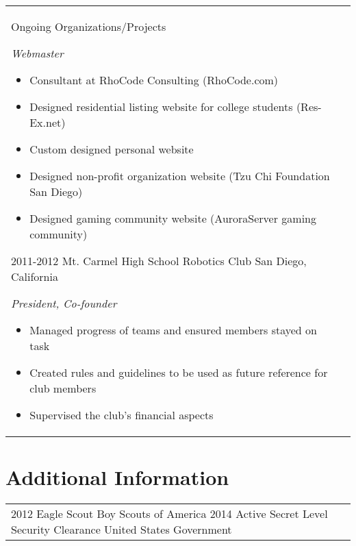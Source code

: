 \documentclass[print]{friggeri-cv} %
\makeatletter
\renewenvironment{entrylist}{%
	\par\begin{tabular*}{\textwidth}{@{\extracolsep{\fill}}ll}
	}{%
\end{tabular*}\par
}
\makeatother
\begin{document}
\begin{entrylist}
\entry
{Ongoing}
{Organizations/Projects}
{ }
{\emph{Webmaster}
\begin{itemize}
\item Consultant at RhoCode Consulting (RhoCode.com)
\item Designed residential listing website for college students (Res-Ex.net)
\item Custom designed personal website
\item Designed non-profit organization website (Tzu Chi Foundation San Diego)
\item Designed gaming community website (AuroraServer gaming community)
\end{itemize}}
\entry
{2011-2012}
{Mt. Carmel High School Robotics Club}
{San Diego, California}
{\emph{President, Co-founder}
\begin{itemize}
\item Managed progress of teams and ensured members stayed on task
\item Created rules and guidelines to be used as future reference for club members
\item Supervised the club's financial aspects
\end{itemize}}

\end{entrylist}


\section{Additional Information}

\begin{entrylist}
\entry
{2012}
{Eagle Scout}
{Boy Scouts of America}
{}
\entry
{2014}
{Active Secret Level Security Clearance}
{United States Government}
{}
\end{entrylist}


\end{document}
